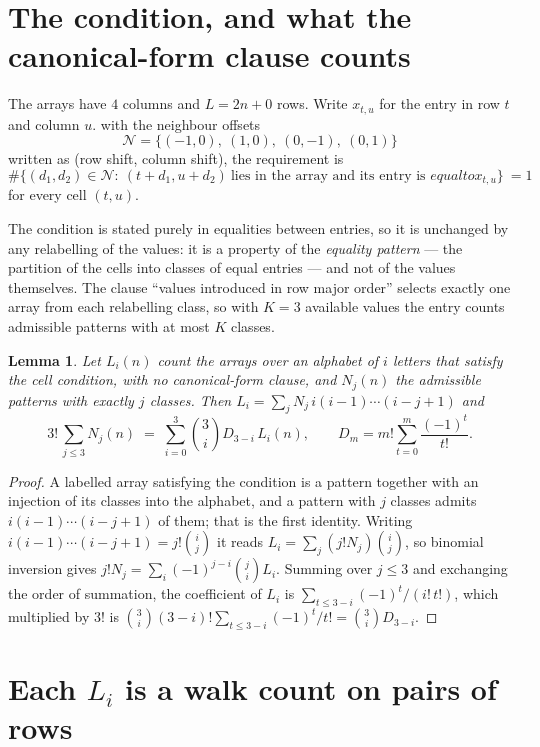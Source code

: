 \documentclass[11pt,a4paper]{article}
\theoremstyle{plain}
\newtheorem{lemma}[theorem]{Lemma}
\theoremstyle{definition}
\begin{document}
\section{The condition, and what the canonical-form clause counts}

The arrays have $4$ columns and $L=2n+0$ rows. Write $x_{t,u}$ for the entry in
row $t$ and column $u$. with the neighbour offsets
\[
\mathcal N=\{(-1,0),\ (1,0),\ (0,-1),\ (0,1)\}
\]
written as (row shift, column shift), the requirement is
\begin{equation}\label{eq:loc}
\#\bigl\{(d_1,d_2)\in\mathcal N:\ (t+d_1,u+d_2)\ \text{lies in the array and its entry is }
equal to x_{t,u}\bigr\}\ =1
\end{equation}
for every cell $(t,u)$.

The condition is stated purely in equalities between entries, so it is unchanged by any
relabelling of the values: it is a property of the \emph{equality pattern} --- the partition
of the cells into classes of equal entries --- and not of the values themselves. The clause
``values introduced in row major order'' selects exactly one array from each relabelling
class, so with $K=3$ available values the entry counts admissible patterns with at most $K$
classes.

\begin{lemma}\label{lem:inv}
Let $L_i(n)$ count the arrays over an alphabet of $i$ letters that satisfy the cell
condition, with no canonical-form clause, and $N_j(n)$ the admissible patterns with exactly
$j$ classes. Then $L_i=\sum_j N_j\,i(i-1)\cdots(i-j+1)$ and
\[
3!\,\sum_{j\le 3}N_j(n)\;=\;\sum_{i=0}^{3}\binom{3}{i}D_{3-i}\,L_i(n),
\qquad D_m=m!\sum_{t=0}^{m}\frac{(-1)^t}{t!} .
\]
\end{lemma}

\begin{proof}
A labelled array satisfying the condition is a pattern together with an injection of its
classes into the alphabet, and a pattern with $j$ classes admits $i(i-1)\cdots(i-j+1)$ of
them; that is the first identity. Writing $i(i-1)\cdots(i-j+1)=j!\binom{i}{j}$ it reads
$L_i=\sum_j(j!N_j)\binom{i}{j}$, so binomial inversion gives
$j!N_j=\sum_i(-1)^{j-i}\binom{j}{i}L_i$. Summing over $j\le3$ and exchanging the
order of summation, the coefficient of $L_i$ is
$\sum_{t\le3-i}(-1)^t/(i!\,t!)$, which multiplied by $3!$ is
$\binom{3}{i}(3-i)!\sum_{t\le3-i}(-1)^t/t!=\binom{3}{i}D_{3-i}$.
\end{proof}

\section{Each $L_i$ is a walk count on pairs of rows}
\end{document}
